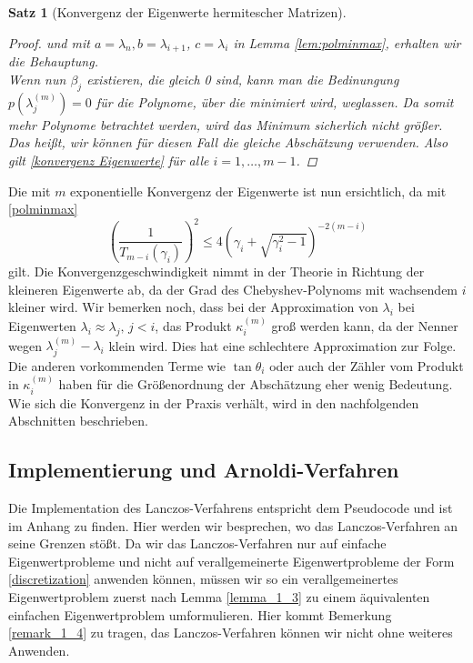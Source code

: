 \documentclass{article}
\theoremstyle{plain}
\newtheorem{theorem}    {Satz}   [section]
\begin{document}
\begin{theorem}[Konvergenz der Eigenwerte hermitescher Matrizen]
\begin{proof}
	und  mit $a = \lambda_n, b= \lambda_{i+1}$, $c = \lambda_i$ in Lemma \ref{lem:polminmax}, erhalten wir die Behauptung.\\

	Wenn nun $\beta_j$ existieren, die gleich 0 sind, kann man die Bedinungung $p(\lambda_j^{(m)}) = 0$ für die Polynome, über die minimiert wird, weglassen.
	Da somit mehr Polynome betrachtet werden, wird das Minimum sicherlich nicht größer. Das heißt, wir können für diesen Fall die gleiche Abschätzung verwenden.
	Also gilt \eqref{konvergenz Eigenwerte} für alle $i = 1, \dots, m-1$.
	\end{proof}
\end{theorem}

Die mit $m$ exponentielle Konvergenz der Eigenwerte ist nun ersichtlich, da mit \eqref{polminmax}
\begin{equation*}
	\left(\frac{1}{T_{m-i}(\gamma_i)}\right)^2 \le 4 \left(\gamma_i + \sqrt{\gamma_i^2 -1}\right)^{-2(m-i)}
\end{equation*}
gilt. Die Konvergenzgeschwindigkeit nimmt in der Theorie in Richtung der kleineren Eigenwerte ab, da der Grad des Chebyshev-Polynoms mit wachsendem $i$ kleiner wird. Wir bemerken noch, dass bei der Approximation von $\lambda_i$ bei Eigenwerten $\lambda_i \approx \lambda_j, \, j < i$, das Produkt $\kappa_i^{(m)}$ groß werden kann, da der Nenner wegen $\lambda^{(m)}_j - \lambda_i$ klein wird. Dies hat eine schlechtere Approximation zur Folge. Die anderen vorkommenden Terme wie $\tan \theta_i$ oder auch der Zähler vom Produkt in $\kappa_i^{(m)}$ haben für die Größenordnung der Abschätzung eher wenig Bedeutung. Wie sich die Konvergenz in der Praxis verhält, wird in den nachfolgenden Abschnitten beschrieben.


\subsection{Implementierung und Arnoldi-Verfahren}

Die Implementation des Lanczos-Verfahrens entspricht dem Pseudocode und ist im Anhang zu finden. Hier werden wir besprechen, wo das Lanczos-Verfahren an seine Grenzen stößt. Da wir das Lanczos-Verfahren nur auf einfache Eigenwertprobleme und nicht auf verallgemeinerte Eigenwertprobleme der Form \eqref{discretization} anwenden können, müssen wir so ein verallgemeinertes Eigenwertproblem zuerst nach Lemma \ref{lemma_1_3} zu einem äquivalenten einfachen Eigenwertproblem umformulieren. Hier kommt Bemerkung \ref{remark_1_4} zu tragen, das Lanczos-Verfahren können wir nicht ohne weiteres Anwenden.
\end{document}

